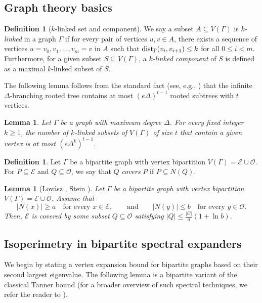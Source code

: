 \documentclass{amsart}
\newtheorem{lem}[thm]{Lemma}
\theoremstyle{definition}
\newtheorem{mydef}[thm]{Definition}
\newcommand{\cO}{\mathcal{O} }
\newcommand{\cE}{\mathcal{E} }
\newcommand{\0}[0]{\emptyset}
\newcommand{\dist}[0]{\mbox{\rm{dist}}}
\begin{document}
\subsection{Graph theory basics}

\begin{mydef}[$k$-linked set and component]
We say a subset $A\subseteq V(\Gamma)$ is \emph{$k$-linked} in a graph $\Gamma$ if for every pair of vertices $u,v\in A$, there exists a sequence of vertices $u=v_0,v_1,\dots,v_m=v$ in $A$ such that $\dist_\Gamma(v_i,v_{i+1})\le k$ for all $0\le i<m$. 
Furthermore, for a given subset $S \subseteq V(\Gamma)$, a \emph{$k$-linked component} of $S$ is defined as a maximal $k$-linked subset of $S$.
\end{mydef}

The following lemma follows from the standard fact (see, e.g., \cite[p.~396, Ex.~11]{knuth1968art}) that the infinite $\Delta$-branching rooted tree contains at most $(e\Delta)^{t-1}$ rooted subtrees with $t$ vertices.

\begin{lem}\label{lem:linked-set-count}
    Let $\Gamma$ be a graph with maximum degree $\Delta$. For every fixed integer $k\geq 1$, the number of $k$-linked subsets of $V(\Gamma)$ of size $t$ that contain a given vertex is at most $(e\Delta^k)^{t-1}$.
\end{lem}

\begin{mydef}\label{def:bipartite-cover}
Let $\Gamma$ be a bipartite graph with vertex bipartition $V(\Gamma)=\cE\cup \cO$. For $P\subseteq \cE$ and $Q\subseteq \cO$, we say that $Q$ \emph{covers} $P$ if $P\subseteq N(Q)$.
\end{mydef}

\begin{lem}[Lov\'asz \cite{Lov75}, Stein \cite{Ste74}] \label{lem:cover}
Let $\Gamma$ be a bipartite graph with vertex bipartition $V(\Gamma)=\cE\cup \cO$. Assume that
\[
|N(x)|\ge a \quad\text{for every }x\in \cE, \qquad \text{and} \qquad |N(y)|\le b \quad\text{for every }y\in \cO.
\]
Then, $\cE$ is covered by some subset $Q\subseteq \cO$ satisfying $|Q|\le \frac{|\cO|}{a}(1+\ln b)$.
\end{lem}

\subsection{Isoperimetry in bipartite spectral expanders}

We begin by stating a vertex expansion bound for bipartite graphs based on their second largest eigenvalue. The following lemma is a bipartite variant of the classical Tanner bound \cite{tanner1984explicit} (for a broader overview of such spectral techniques, we refer the reader to \cite{hoory2006expander}).
\end{document}
